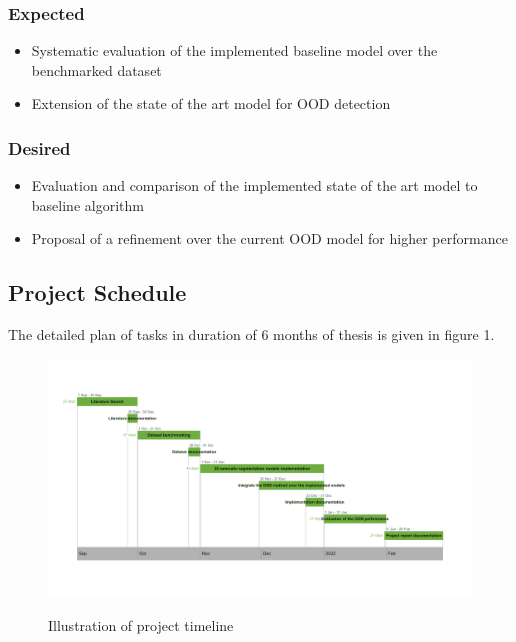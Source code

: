 \documentclass[thesis]{mas_proposal}
\begin{document}
\subsubsection*{Expected}
\begin{itemize}
    \item Systematic evaluation of the implemented baseline model over the benchmarked dataset
    \item Extension of the state of the art model for OOD detection
\end{itemize}

\subsubsection*{Desired}
\begin{itemize}
    \item Evaluation and comparison of the implemented state of the art model to baseline algorithm
    \item Proposal of a refinement over the current OOD model for higher performance
\end{itemize}

\subsection{Project Schedule}
The detailed plan of tasks in duration of 6 months of thesis is given in figure 1.

\begin{figure}[h!]
    \centering
    \caption{Illustration of project timeline}
    \includegraphics[scale=0.16]{images/rnd_deliverable_timeline}
    \label{fig:schedl}
\end{figure}

\nocite{*}

\end{document}
